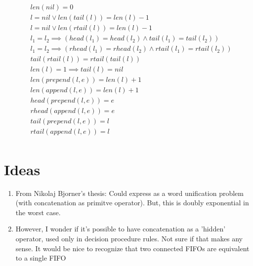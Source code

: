 \documentclass[10pt,twocolumn,letterpaper]{article}
\begin{document}
\begin{equation}
\begin{aligned}
&len(\textit{nil}) = 0 \\
&l = nil \vee len(tail(l)) = len(l) - 1 \\
&l = nil \vee len(rtail(l)) = len(l) - 1 \\
&l_1 = l_2 \implies (head(l_1) = head(l_2) \wedge tail(l_1) = tail(l_2)) \\
&l_1 = l_2 \implies (rhead(l_1) = rhead(l_2) \wedge rtail(l_1) = rtail(l_2)) \\
&tail(rtail(l)) = rtail(tail(l)) \\
&len(l) = 1 \implies tail(l) = nil \\
&len(prepend(l, e)) = len(l) + 1 \\
&len(append(l, e)) = len(l) + 1 \\
&head(prepend(l, e)) = e  \\
&rhead(append(l, e)) = e  \\
&tail(prepend(l, e)) = l  \\
&rtail(append(l, e)) = l  \\
\end{aligned}
\end{equation}

\section{Ideas}
\begin{enumerate}
\item From Nikolaj Bjorner's thesis: Could express as a word unification problem (with concatenation as primitve operator). But, this is doubly exponential in the worst case.
\item However, I wonder if it's possible to have concatenation as a 'hidden' operator, used only in decision procedure rules. Not sure if that makes any sense. It would be nice to recognize that two connected FIFOs are equivalent to a single FIFO
\end{enumerate}
\end{document}
